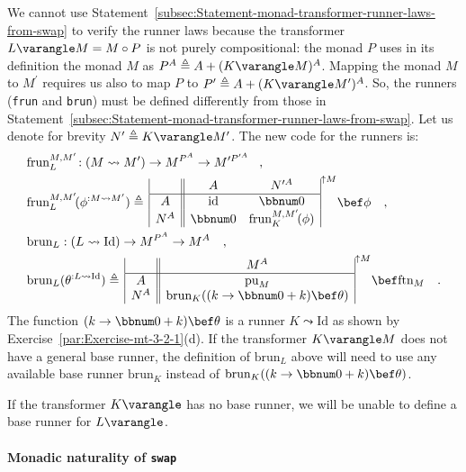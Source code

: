 We cannot use Statement~\ref{subsec:Statement-monad-transformer-runner-laws-from-swap}
to verify the runner laws because the transformer $L\varangle M=M\circ P$
is not purely compositional: the monad $P$ uses in its definition
the monad $M$ as $P^{A}\triangleq A+(K\varangle M)^{A}$. Mapping
the monad $M$ to $M^{\prime}$ requires us also to map $P$ to $P^{\prime}\triangleq A+(K\varangle M^{\prime})^{A}$.
So, the runners (\lstinline!frun! and \lstinline!brun!) must be
defined differently from those in Statement~\ref{subsec:Statement-monad-transformer-runner-laws-from-swap}.
Let us denote for brevity $N^{\prime}\triangleq K\varangle M^{\prime}$.
The new code for the runners is:
\begin{align*}
 & \text{frun}_{L}^{M,M^{\prime}}\!:(M\leadsto M^{\prime})\rightarrow M^{P^{A}}\rightarrow M^{\prime P^{\prime A}}\!\quad,\\
 & \text{frun}_{L}^{M,M^{\prime}}\!(\phi^{:M\leadsto M^{\prime}})\triangleq\,\begin{array}{|c||cc|}
 & A & N^{\prime A}\\
\hline A & \text{id} & \bbnum 0\\
N^{A} & \bbnum 0 & \text{frun}_{K}^{M,M^{\prime}}\!(\phi)
\end{array}^{\uparrow M}\bef\phi\quad,\\
 & \text{brun}_{L}:(L\leadsto\text{Id})\rightarrow M^{P^{A}}\rightarrow M^{A}\quad,\\
 & \text{brun}_{L}(\theta^{:L\leadsto\text{Id}})\triangleq\,\begin{array}{|c||c|}
 & M^{A}\\
\hline A & \text{pu}_{M}\\
N^{A} & \text{brun}_{K}((k\rightarrow\bbnum 0+k)\bef\theta)
\end{array}^{\uparrow M}\bef\text{ftn}_{M}\quad.
\end{align*}
The function $(k\rightarrow\bbnum 0+k)\bef\theta$ is a runner $K\leadsto\text{Id}$
as shown by Exercise~\ref{par:Exercise-mt-3-2-1}(d). If the transformer
$K\varangle M$ does not have a general base runner, the definition
of $\text{brun}_{L}$ above will need to use any available base runner
$\text{brun}_{K}$ instead of $\text{brun}_{K}((k\rightarrow\bbnum 0+k)\bef\theta)$.

If the transformer $K\varangle$ has no base runner, we will be unable
to define a base runner for $L\varangle$.

\paragraph{Monadic naturality of \texttt{swap}}

